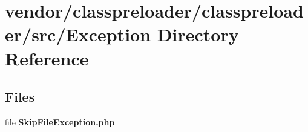 \section{vendor/classpreloader/classpreloader/src/\+Exception Directory Reference}
\label{dir_cc885d0ee2b3732c6bbfe5412c484586}
\subsection*{Files}
\begin{DoxyCompactItemize}
\item 
file {\bf Skip\+File\+Exception.\+php}
\end{DoxyCompactItemize}
